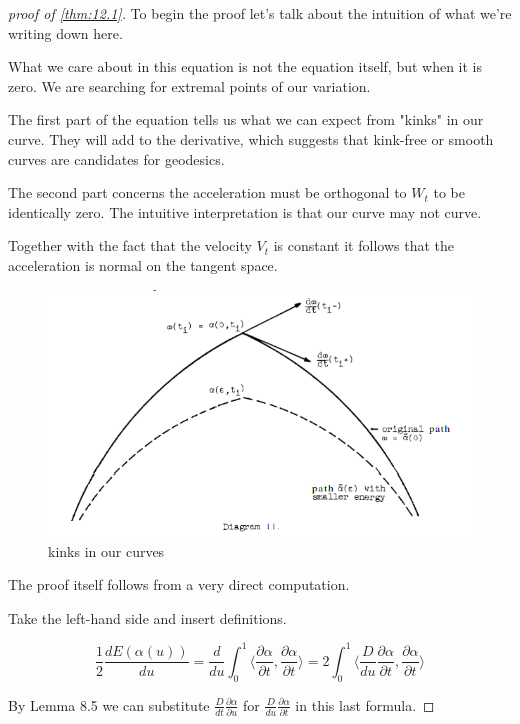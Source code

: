 \documentclass{article}
\newtheorem{proof}{Proof}
\newcommand{\angle}[1]{\langle #1 \rangle}
\begin{document}
\begin{proof}[proof of \ref{thm:12.1}]
    To begin the proof let's talk about the intuition of what we're writing down here.

    What we care about in this equation is not the equation itself, but when it is zero. We are
    searching for extremal points of our variation.

    The first part of the equation tells us what we can expect from "kinks" in our curve. They will
    add to the derivative, which suggests that kink-free or smooth curves are candidates for
    geodesics.

    The second part concerns the acceleration must be orthogonal to $W_t$ to be identically zero.
    The intuitive interpretation is that our curve may not curve.

    Together with the fact that the velocity $V_t$ is constant it follows that the acceleration is
    normal on the tangent space.


    \begin{figure}
        \includegraphics{img/kinky.png}
        \caption{kinks in our curves}
        \label{fig:kinky}
    \end{figure}


    The proof itself follows from a very direct computation.


    Take the left-hand side and insert definitions.

    \[
        \frac{1}{2} \frac{dE(\alpha(u))}{du} =
        \frac{d}{du} \int_0^1 \angle{\frac{\partial \alpha}{\partial t}, \frac{\partial \alpha}{\partial t}} =
        2 \int_0^1 \angle{\frac{D}{du} \frac{\partial \alpha}{\partial t}, \frac{\partial \alpha}{\partial t}}
    \]

    By Lemma 8.5 we can substitute
    $\frac{D}{dt} \frac{\partial \alpha}{\partial u}$ for
    $\frac{D}{du} \frac{\partial \alpha}{\partial t}$ in this last formula.


\end{proof}
\end{document}
